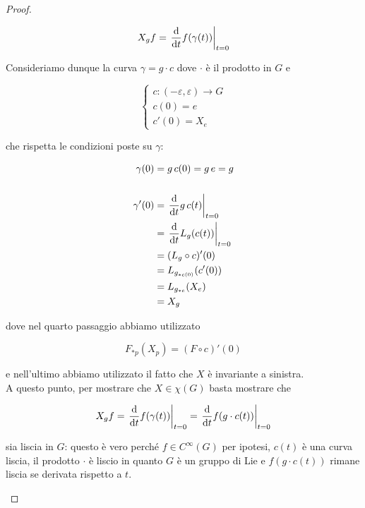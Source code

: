 \begin{proof}
\begin{enumerate}
		\begin{equation}
			X_{g} f = \eval{ \dv{t} f(\gamma(t)) }_{t=0}
		\end{equation}
	
		Consideriamo dunque la curva $ \gamma = g \cdot c $ dove $ \cdot $ è il prodotto in $ G $ e
		
		\begin{equation}
			\begin{cases}
				c : (-\varepsilon,\varepsilon) \to G\\
				c(0) = e\\
				c'(0) = X_{e}
			\end{cases}
		\end{equation}
	
		che rispetta le condizioni poste su $ \gamma $:
		
		\begin{align}
			\begin{split}
				\gamma(0) &= g \, c(0)= g \, e = g\\\\
				\gamma'(0) &= \eval{ \dv{t} g \, c(t) }_{t=0}\\
				&= \eval{ \dv{t} L_{g}(c(t)) }_{t=0}\\
				&= (L_{g} \circ c)'(0)\\
				&= L_{g_{*c(0)}} (c'(0))\\
				&= L_{g_{*e}} (X_{e})\\
				&= X_{g}
			\end{split}
		\end{align}
	
		dove nel quarto passaggio abbiamo utilizzato
		
		\begin{equation}
			F_{*p}(X_{p}) = (F \circ c)'(0)
		\end{equation}
		
		e nell'ultimo abbiamo utilizzato il fatto che $ X $ è invariante a sinistra.\\
		A questo punto, per mostrare che $ X \in \chi(G) $ basta mostrare che
		
		\begin{equation}
			X_{g} f = \eval{ \dv{t} f(\gamma(t)) }_{t=0} = \eval{ \dv{t} f(g \cdot c(t)) }_{t=0}
		\end{equation}
	
		sia liscia in $ G $: questo è vero perché $ f \in C^{\infty}(G) $ per ipotesi, $ c(t) $ è una curva liscia, il prodotto $ \cdot $ è liscio in quanto $ G $ è un gruppo di Lie e $ f(g \cdot c(t)) $ rimane liscia se derivata rispetto a $ t $.
		

\end{enumerate}
\end{proof}
